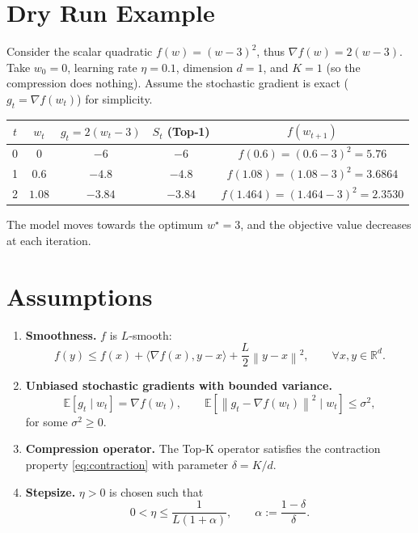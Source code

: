 \documentclass{article}
\newcommand{\E}{\mathbb{E}}
\newcommand{\R}{\mathbb{R}}
\newcommand{\norm}[1]{\left\lVert#1\right\rVert}
\begin{document}
\section*{Dry Run Example}
Consider the scalar quadratic $f(w)=(w-3)^2$, thus $\nabla f(w)=2(w-3)$.  
Take $w_0=0$, learning rate $\eta=0.1$, dimension $d=1$, and $K=1$ (so the
compression does nothing).  Assume the stochastic gradient is exact
($g_t=\nabla f(w_t)$) for simplicity.

\begin{center}
\begin{tabular}{c|c|c|c|c}
$t$ & $w_t$ & $g_t=2(w_t-3)$ & $S_t$ (Top‑1) & $f(w_{t+1})$\\\hline
0 & $0$ & $-6$ & $-6$ & $f(0.6) = (0.6-3)^2=5.76$\\
1 & $0.6$ & $-4.8$ & $-4.8$ & $f(1.08)= (1.08-3)^2=3.6864$\\
2 & $1.08$ & $-3.84$ & $-3.84$ & $f(1.464)= (1.464-3)^2=2.3530$\\
\end{tabular}
\end{center}
The model moves towards the optimum $w^\star=3$, and the objective value
decreases at each iteration.

\newpage
\section*{Assumptions}
\begin{enumerate}[label=\textbf{A\arabic*:},leftmargin=*]
\item \textbf{Smoothness.}  $f$ is $L$‑smooth:
\[
f(y)\le f(x)+\langle\nabla f(x),y-x\rangle+\frac{L}{2}\norm{y-x}^{2},
\qquad\forall x,y\in\R^{d}.
\tag{A1}
\]
\item \textbf{Unbiased stochastic gradients with bounded variance.}
\[
\E\!\left[g_t\mid w_t\right]=\nabla f(w_t),\qquad
\E\!\left[\norm{g_t-\nabla f(w_t)}^{2}\mid w_t\right]\le\sigma^{2},
\tag{A2}
\]
for some $\sigma^{2}\ge0$.
\item \textbf{Compression operator.}  The Top‑K operator satisfies the
contraction property \eqref{eq:contraction} with parameter
$\delta=K/d$.
\item \textbf{Stepsize.}  $\eta>0$ is chosen such that
\[
0<\eta\le\frac{1}{L(1+\alpha)},\qquad 
\alpha:=\frac{1-\delta}{\delta}.
\tag{A4}
\]
\end{enumerate}
\end{document}
